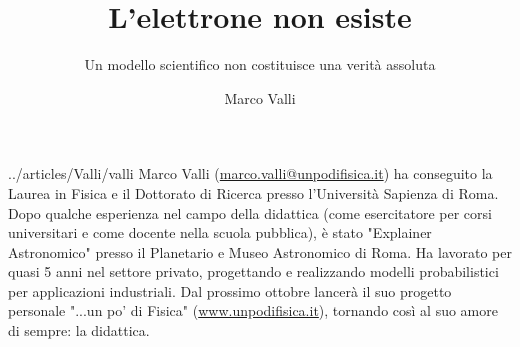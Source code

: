 ﻿\title{L'elettrone non esiste}
\subtitle{Un modello scientifico non costituisce una verità assoluta}
\suptitle{\phantom{x}}
\author{Marco Valli}
\maketitle
\begin{small}
\pichskip{4mm}
\nobalance



\vfill
\begin{thebiography}{../articles/Valli/valli}
Marco Valli (\url{marco.valli@unpodifisica.it}) ha conseguito la Laurea in Fisica e il Dottorato di Ricerca presso l'Università Sapienza di Roma. Dopo qualche esperienza nel campo della didattica (come esercitatore per corsi universitari e come docente nella scuola pubblica), è stato "Explainer Astronomico" presso il Planetario e Museo Astronomico di Roma. Ha lavorato per quasi 5 anni nel settore privato, progettando e realizzando modelli probabilistici per applicazioni industriali. Dal prossimo ottobre lancerà il suo progetto personale "...un po' di Fisica" (\url{www.unpodifisica.it}), tornando così al suo amore di sempre: la didattica.
\end{thebiography}
\end{small}

